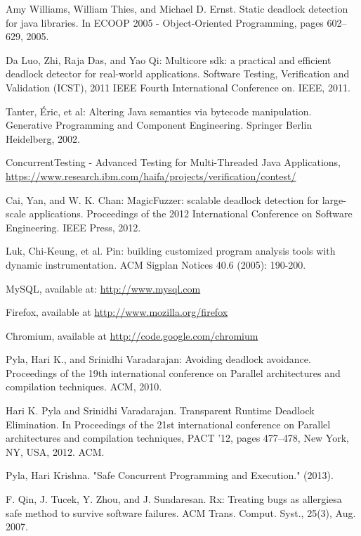 \begin{thebibliography}{4}
 Amy Williams, William Thies, and Michael D. Ernst. Static deadlock detection for java
libraries. In ECOOP 2005 - Object-Oriented Programming, pages 602–629, 2005.

 Da Luo, Zhi, Raja Das, and Yao Qi: Multicore sdk: a practical and efficient deadlock detector for real-world applications.
Software Testing, Verification and Validation (ICST), 2011 IEEE Fourth International Conference on. IEEE, 2011.

 Tanter, Éric, et al: Altering Java semantics via bytecode manipulation.
Generative Programming and Component Engineering. Springer Berlin Heidelberg, 2002.

 ConcurrentTesting - Advanced Testing for Multi-Threaded Java Applications, \url{https://www.research.ibm.com/haifa/projects/verification/contest/}

 Cai, Yan, and W. K. Chan: MagicFuzzer: scalable deadlock detection for large-scale applications.
Proceedings of the 2012 International Conference on Software Engineering. IEEE Press, 2012.

 Luk, Chi-Keung, et al. Pin: building customized program analysis tools with dynamic instrumentation.
ACM Sigplan Notices 40.6 (2005): 190-200.

 MySQL, available at: \url{http://www.mysql.com}

 Firefox, available at \url{http://www.mozilla.org/firefox}

 Chromium, available at \url{http://code.google.com/chromium}

 Pyla, Hari K., and Srinidhi Varadarajan: Avoiding deadlock avoidance.
Proceedings of the 19th international conference on Parallel architectures and compilation techniques. ACM, 2010.

 Hari K. Pyla and Srinidhi Varadarajan. Transparent Runtime Deadlock Elimination. In
Proceedings of the 21st international conference on Parallel architectures and compilation
techniques, PACT ’12, pages 477–478, New York, NY, USA, 2012. ACM.

 Pyla, Hari Krishna. "Safe Concurrent Programming and Execution." (2013).

 F. Qin, J. Tucek, Y. Zhou, and J. Sundaresan. Rx: Treating bugs as
allergiesa safe method to survive software failures. ACM Trans. Comput.
Syst., 25(3), Aug. 2007.


\end{thebibliography}
